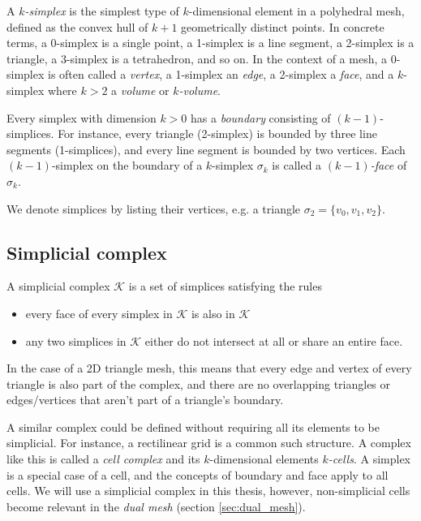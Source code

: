 \documentclass[utf8,english]{gradu3}
\begin{document}
A \textit{$k$-simplex} is the simplest type of $k$-dimensional element
in a polyhedral mesh, defined as
the convex hull of $k + 1$ geometrically distinct points.
In concrete terms, a 0-simplex is a single point,
a 1-simplex is a line segment, a 2-simplex is a triangle,
a 3-simplex is a tetrahedron, and so on.
In the context of a mesh, a 0-simplex is often called a \textit{vertex},
a 1-simplex an \textit{edge}, a 2-simplex a \textit{face},
and a $k$-simplex where $k > 2$ a \textit{volume} or \textit{$k$-volume}.

Every simplex with dimension $k > 0$
has a \textit{boundary} consisting of $(k-1)$-simplices.
For instance, every triangle (2-simplex) is bounded by three line segments (1-simplices),
and every line segment is bounded by two vertices.
Each $(k-1)$-simplex on the boundary of a $k$-simplex $\sigma_k$
is called a \textit{$(k-1)$-face} of $\sigma_k$.

We denote simplices by listing their vertices, e.g. a triangle
$\sigma_2 = \{v_0, v_1, v_2\}$.


\subsection{Simplicial complex}

A simplicial complex $\mathcal{K}$ is a set of simplices satisfying the rules

\begin{itemize}
  \item every face of every simplex in $\mathcal{K}$ is also in $\mathcal{K}$
  \item any two simplices in $\mathcal{K}$ either do not intersect at all
    or share an entire face.
\end{itemize}

In the case of a 2D triangle mesh, this means
that every edge and vertex of every triangle is also part of the complex,
and there are no overlapping triangles
or edges/vertices that aren't part of a triangle's boundary.

A similar complex could be defined without requiring
all its elements to be simplicial.
For instance, a rectilinear grid is a common such structure.
A complex like this is called a \textit{cell complex}
and its $k$-dimensional elements \textit{$k$-cells}.
A simplex is a special case of a cell,
and the concepts of boundary and face apply to all cells.
We will use a simplicial complex in this thesis,
however, non-simplicial cells become relevant in the \textit{dual mesh}
(section \ref{sec:dual_mesh}).
\end{document}
